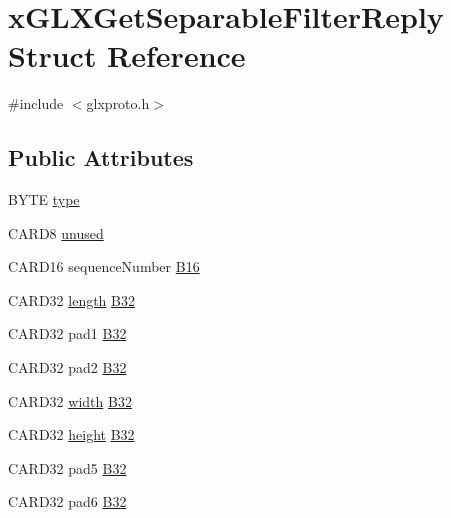 \hypertarget{structx_g_l_x_get_separable_filter_reply}{}\section{x\+G\+L\+X\+Get\+Separable\+Filter\+Reply Struct Reference}
\label{structx_g_l_x_get_separable_filter_reply}


{\ttfamily \#include $<$glxproto.\+h$>$}

\subsection*{Public Attributes}
\begin{DoxyCompactItemize}
\item 
B\+Y\+TE \hyperlink{structx_g_l_x_get_separable_filter_reply_a90e5ab9c26e09a6623d36783067ad2c2}{type}
\item 
C\+A\+R\+D8 \hyperlink{structx_g_l_x_get_separable_filter_reply_a458c6a2740295a30f7eec17c9f0e88b3}{unused}
\item 
C\+A\+R\+D16 sequence\+Number \hyperlink{structx_g_l_x_get_separable_filter_reply_a7102606a48e724fdbfac58c11c4b67d2}{B16}
\item 
C\+A\+R\+D32 \hyperlink{glcorearb_8h_ab9c919755bde3b34349e23a32b4e0fa7}{length} \hyperlink{structx_g_l_x_get_separable_filter_reply_aa096a5264d536395cffa0696bbfbb7fe}{B32}
\item 
C\+A\+R\+D32 pad1 \hyperlink{structx_g_l_x_get_separable_filter_reply_a6087feda0652ef4ca1839fe46e3222b5}{B32}
\item 
C\+A\+R\+D32 pad2 \hyperlink{structx_g_l_x_get_separable_filter_reply_a8836afa408e9143eb88984b2738c56d3}{B32}
\item 
C\+A\+R\+D32 \hyperlink{gl_8h_a9a82cf3caff84cabc4598e2619faac17}{width} \hyperlink{structx_g_l_x_get_separable_filter_reply_acc8380eab062e4627e9ce4f1381af8a8}{B32}
\item 
C\+A\+R\+D32 \hyperlink{gl_8h_aa352f2804b9902ac30769c00dde75d5f}{height} \hyperlink{structx_g_l_x_get_separable_filter_reply_aa82381273850ca8a184dd42bc5882360}{B32}
\item 
C\+A\+R\+D32 pad5 \hyperlink{structx_g_l_x_get_separable_filter_reply_a01753c08d0875f8258344b629f2bd7d7}{B32}
\item 
C\+A\+R\+D32 pad6 \hyperlink{structx_g_l_x_get_separable_filter_reply_a402ec89920d1e98f8547c51aed2e64e4}{B32}
\end{DoxyCompactItemize}


